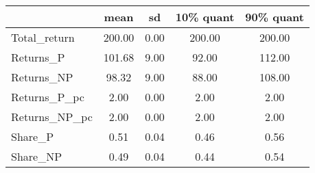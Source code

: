\begin{tabular}{lcccc}
\toprule
{} &    mean &    sd &  10\% quant &  90\% quant \\
\midrule
Total\_return  &  200.00 &  0.00 &     200.00 &     200.00 \\
Returns\_P     &  101.68 &  9.00 &      92.00 &     112.00 \\
Returns\_NP    &   98.32 &  9.00 &      88.00 &     108.00 \\
Returns\_P\_pc  &    2.00 &  0.00 &       2.00 &       2.00 \\
Returns\_NP\_pc &    2.00 &  0.00 &       2.00 &       2.00 \\
Share\_P       &    0.51 &  0.04 &       0.46 &       0.56 \\
Share\_NP      &    0.49 &  0.04 &       0.44 &       0.54 \\
\bottomrule
\end{tabular}
